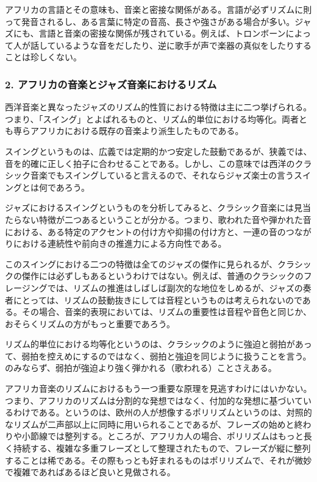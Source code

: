 アフリカの言語とその意味も、音楽と密接な関係がある。言語が必ずリズムに則って発音されるし、ある言葉に特定の音高、長さや強さがある場合が多い。ジャズにも、言語と音楽の密接な関係が残されている。例えば、トロンボーンによって人が話しているような音をだしたり、逆に歌手が声で楽器の真似をしたりすることは珍しくない。

\subsubsection{2. アフリカの音楽とジャズ音楽におけるリズム}

西洋音楽と異なったジャズのリズム的性質における特徴は主に二つ挙げられる。つまり、「スイング」とよばれるものと、リズム的単位における均等化。両者とも専らアフリカにおける既存の音楽より派生したものである。

スイングというものは、広義では定期的かつ安定した鼓動であるが、狭義では、音を的確に正しく拍子に合わせることである。しかし、この意味では西洋のクラシック音楽でもスイングしていると言えるので、それならジャズ楽士の言うスイングとは何であろう。

ジャズにおけるスイングというものを分析してみると、クラシック音楽には見当たらない特徴が二つあるということが分かる。つまり、歌われた音や弾かれた音における、ある特定のアクセントの付け方や抑揚の付け方と、一連の音のつながりにおける連続性や前向きの推進力による方向性である。

このスイングにおける二つの特徴は全てのジャズの傑作に見られるが、クラシックの傑作には必ずしもあるというわけではない。例えば、普通のクラシックのフレージングでは、リズムの推進はしばしば副次的な地位をしめるが、ジャズの奏者にとっては、リズムの鼓動抜きにしては音程というものは考えられないのである。その場合、音楽的表現においては、リズムの重要性は音程や音色と同じか、おそらくリズムの方がもっと重要であろう。

リズム的単位における均等化というのは、クラシックのように強迫と弱拍があって、弱拍を控えめにするのではなく、弱拍と強迫を同じように扱うことを言う。のみならず、弱拍が強迫より強く弾かれる（歌われる）ことさえある。

アフリカ音楽のリズムにおけるもう一つ重要な原理を見逃すわけにはいかない。つまり、アフリカのリズムは分割的な発想ではなく、付加的な発想に基づいているわけである。というのは、欧州の人が想像するポリリズムというのは、対照的なリズムが二声部以上に同時に用いられることであるが、フレーズの始めと終わりや小節線では整列する。ところが、アフリカ人の場合、ポリリズムはもっと長く持続する、複雑な多重フレーズとして整理されたもので、フレーズが縦に整列することは稀である。その際もっとも好まれるものはポリリズムで、それが微妙で複雑であればあるほど良いと見做される。

